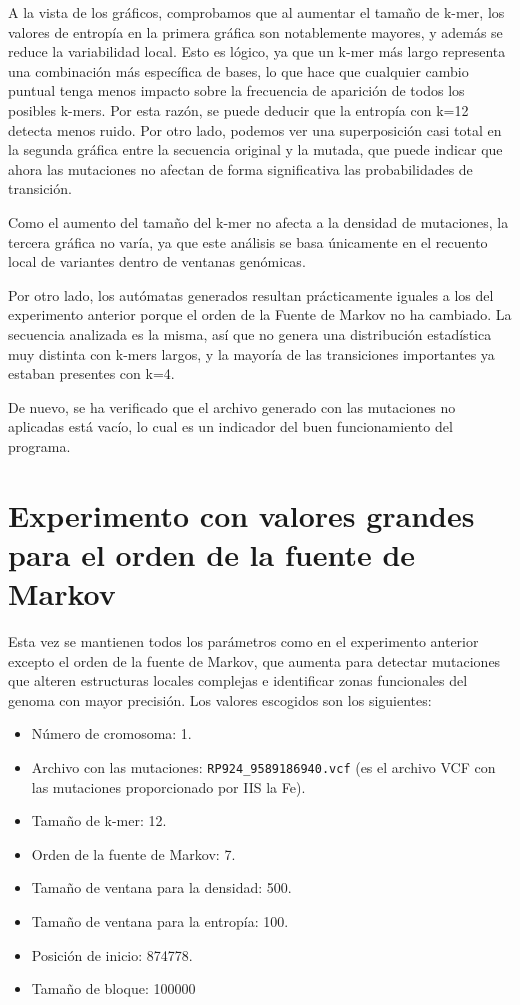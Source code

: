 \documentclass[11pt,spanish,listoffigures,listoftables]{tfgetsinf}
\begin{document}
A la vista de los gráficos, comprobamos que al aumentar el tamaño de k-mer, los valores de entropía en la primera gráfica son notablemente mayores, y además se reduce la variabilidad local. Esto es lógico, ya que un k-mer más largo representa una combinación más específica de bases, lo que hace que cualquier cambio puntual tenga menos impacto sobre la frecuencia de aparición de todos los posibles k-mers. Por esta razón, se puede deducir que la entropía con k=12 detecta menos ruido. Por otro lado, podemos ver una superposición casi total en la segunda gráfica entre la secuencia original y la mutada, que puede indicar que ahora las mutaciones no afectan de forma significativa las probabilidades de transición. 

Como el aumento del tamaño del k-mer no afecta a la densidad de mutaciones, la tercera gráfica no varía, ya que este análisis se basa únicamente en el recuento local de variantes dentro de ventanas genómicas. 

Por otro lado, los autómatas generados resultan prácticamente iguales a los del experimento anterior porque el orden de la Fuente de Markov no ha cambiado. La secuencia analizada es la misma, así que no genera una distribución estadística muy distinta con k-mers largos, y la mayoría de las transiciones importantes ya estaban presentes con k=4.

De nuevo, se ha verificado que el archivo generado con las mutaciones no aplicadas está vacío, lo cual es un indicador del buen funcionamiento del programa.


\section{Experimento con valores grandes para el orden de la fuente de Markov}

Esta vez se mantienen todos los parámetros como en el experimento anterior excepto el orden de la fuente de Markov, que aumenta para detectar mutaciones que alteren estructuras locales complejas e identificar zonas funcionales del genoma con mayor precisión. Los valores escogidos son los siguientes:

\begin{itemize}
   \item Número de cromosoma: 1.
   \item Archivo con las mutaciones: \texttt{RP924\_9589186940.vcf}  (es el archivo \ac{VCF} con las mutaciones proporcionado por \ac{IIS} la Fe).
   \item Tamaño de k-mer: 12.
   \item Orden de la fuente de Markov: 7.
   \item Tamaño de ventana para la densidad: 500.
   \item Tamaño de ventana para la entropía: 100.
   \item Posición de inicio: 874778.
   \item Tamaño de bloque: 100000 
\end{itemize}
\end{document}
